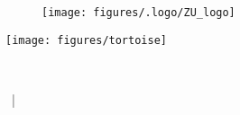 
\begin{figure}[t]
	\flushright
	\texttt{[image: figures/.logo/ZU\_logo]}
\end{figure}

\vspace*{3 cm}

\centering

\texttt{[image: figures/tortoise]}




\centering {\Huge \Title}\\
\smallskip
\centering {\Large \Subtitle}


\vspace{\fill}


\centering \Name  ~| \Programme

\newpage
\tableofcontents
\listoftables
\listoffigures
\newpage
{}